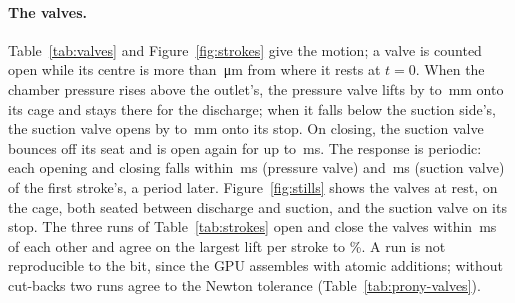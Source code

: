 \documentclass[sigconf,nonacm]{acmart}
\begin{document}
\paragraph{The valves.} Table~\ref{tab:valves} and Figure~\ref{fig:strokes} give the motion; a
valve is counted open while its centre is more than \trLiftOpen\,\si{\micro\metre} from where it
rests at $t=0$. When the chamber pressure rises above the outlet's, the pressure valve lifts by
\trPvPeakMin{} to \trPvPeakMax\,\si{\milli\metre} onto its cage and stays there for the
discharge; when it falls below the suction side's, the suction valve opens by \trSvPeakMin{} to
\trSvPeakMax\,\si{\milli\metre} onto its stop. On closing, the suction valve bounces off its seat
and is open again for up to \trSvReboundMax\,\si{\milli\second}. The response is periodic: each
opening and closing falls within \trPvPeriodic\,\si{\milli\second} (pressure valve) and
\trSvPeriodic\,\si{\milli\second} (suction valve) of the first stroke's, a period later.
Figure~\ref{fig:stills} shows the valves at rest, on the cage, both seated between discharge and
suction, and the suction valve on its stop. The three runs of Table~\ref{tab:strokes} open and close
the valves within \trEventSpread\,\si{\milli\second} of each other and agree on the largest lift per
stroke to \trPeakSpread\%. A run is not reproducible to the bit, since the GPU assembles with
atomic additions; without cut-backs two runs agree to the Newton tolerance
(Table~\ref{tab:prony-valves}).
\end{document}
